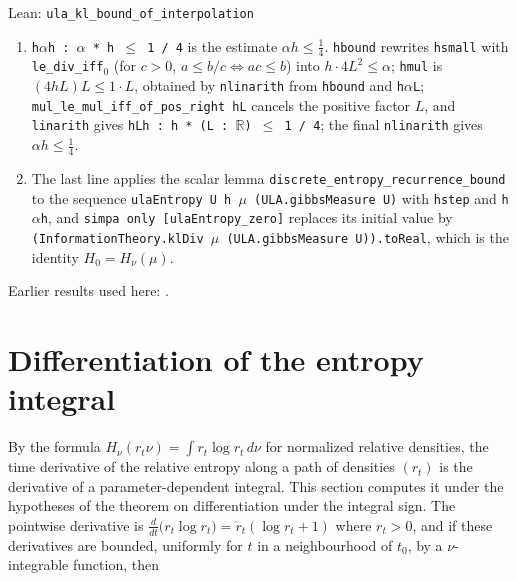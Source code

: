 \documentclass[11pt,a4paper]{report}
\begin{document}
\begin{leanbox}{Lean: \texttt{ula\_\allowbreak{}kl\_\allowbreak{}bound\_\allowbreak{}of\_\allowbreak{}interpolation}}
\begin{enumerate}
\item \texttt{h\ensuremath{\alpha}h : \ensuremath{\alpha} * h \ensuremath{\le} 1 /\allowbreak{} 4} is the estimate \(\alpha h\le\frac14\). \texttt{hbound} rewrites \texttt{hsmall} with \texttt{le\_\allowbreak{}div\_\allowbreak{}iff\ensuremath{{}_{0}}} (for \(c>0\), \(a\le b/c\iff ac\le b\)) into \(h\cdot4L^2\le\alpha\); \texttt{hmul} is \((4hL)L\le1\cdot L\), obtained by \texttt{nlinarith} from \texttt{hbound} and \texttt{h\ensuremath{\alpha}\allowbreak{}L}; \texttt{mul\_\allowbreak{}le\_\allowbreak{}mul\_\allowbreak{}iff\_\allowbreak{}of\_\allowbreak{}pos\_\allowbreak{}right h\allowbreak{}L} cancels the positive factor \(L\), and \texttt{linarith} gives \texttt{h\allowbreak{}Lh : h * (L : \ensuremath{\mathbb R}) \ensuremath{\le} 1 /\allowbreak{} 4}; the final \texttt{nlinarith} gives \(\alpha h\le\frac14\).

\item The last line applies the scalar lemma \texttt{discrete\_\allowbreak{}entropy\_\allowbreak{}recurrence\_\allowbreak{}bound} to the sequence \texttt{ula\allowbreak{}Entropy U h \ensuremath{\mu} (ULA.\allowbreak{}gibbs\allowbreak{}Measure U)} with \texttt{hstep} and \texttt{h\ensuremath{\alpha}h}, and \texttt{simpa only [ula\allowbreak{}Entropy\_\allowbreak{}zero]} replaces its initial value by \texttt{(Information\allowbreak{}Theory.\allowbreak{}kl\allowbreak{}Div \ensuremath{\mu} (ULA.\allowbreak{}gibbs\allowbreak{}Measure U)).\allowbreak{}to\allowbreak{}Real}, which is the identity \(H_0=H_\nu(\mu)\).

\end{enumerate}
\end{leanbox}


Earlier results used here: \cite[Section~3.26.3]{LangevinLean2026ULASC}.
\section{\texorpdfstring{Differentiation of the entropy integral}{Differentiation of the entropy integral}}
\label{proof-module-UnadjustedLangevin-LSI-EntropyDerivative-lean}


By the formula \(H_\nu(r_t\nu)=\int r_t\log r_t\,d\nu\) for normalized relative densities, the time derivative of the relative entropy along a path of densities \((r_t)\) is the derivative of a parameter-dependent integral. This section computes it under the hypotheses of the theorem on differentiation under the integral sign. The pointwise derivative is \(\frac{d}{dt}\bigl(r_t\log r_t\bigr)=\dot r_t(\log r_t+1)\) where \(r_t>0\), and if these derivatives are bounded, uniformly for \(t\) in a neighbourhood of \(t_0\), by a \(\nu\)-integrable function, then
\end{document}
